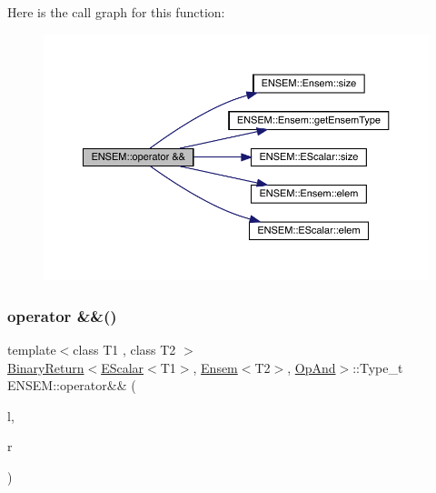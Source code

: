 Here is the call graph for this function\+:\nopagebreak
\begin{figure}[H]
\begin{center}
\leavevmode
\includegraphics[width=350pt]{d1/d9e/group__eensem_ga00415a6169d18f80656be828f11a157b_cgraph}
\end{center}
\end{figure}
\mbox{\label{group__eensem_ga327bfc24e647dfce0a0b0373f4e72084}} 
\subsubsection{\texorpdfstring{operator \&\&()}{operator \&\&()}\hspace{0.1cm}{\footnotesize\ttfamily [3/3]}}
{\footnotesize\ttfamily template$<$class T1 , class T2 $>$ \\
\mbox{\hyperlink{structENSEM_1_1BinaryReturn}{Binary\+Return}}$<$\mbox{\hyperlink{classENSEM_1_1EScalar}{E\+Scalar}}$<$T1$>$, \mbox{\hyperlink{classENSEM_1_1Ensem}{Ensem}}$<$T2$>$, \mbox{\hyperlink{structENSEM_1_1OpAnd}{Op\+And}}$>$\+::Type\+\_\+t E\+N\+S\+E\+M\+::operator\&\& (\begin{DoxyParamCaption}\item[{const \mbox{\hyperlink{classENSEM_1_1EScalar}{E\+Scalar}}$<$ T1 $>$ \&}]{l,  }\item[{const \mbox{\hyperlink{classENSEM_1_1Ensem}{Ensem}}$<$ T2 $>$ \&}]{r }\end{DoxyParamCaption})\hspace{0.3cm}{\ttfamily [inline]}}

